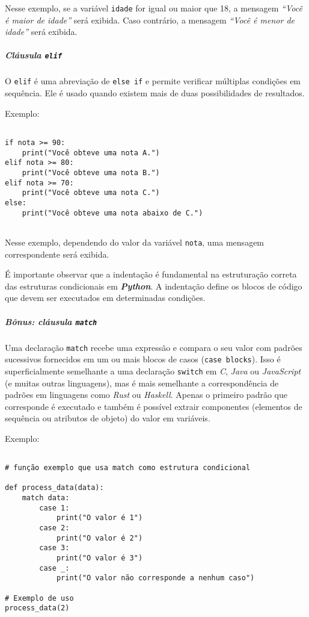 \documentclass[a4paper, 12pt, onecolumn,singlespacing]{article}
\begin{document}
Nesse exemplo, se a variável \texttt{idade} for igual ou maior que 18, a mensagem \textit{``Você é maior de idade''} será exibida. Caso contrário, a mensagem \textit{``Você é menor de idade''} será exibida.

	\subparagraph{Cláusula \texttt{elif}}
	\label{python_clausula_elif}
	O \texttt{elif} é uma abreviação de \texttt{else if} e permite verificar múltiplas condições em sequência. Ele é usado quando existem mais de duas possibilidades de resultados.
	
	
	Exemplo:
	
	
	\begin{verbatim}
		
if nota >= 90:
	print("Você obteve uma nota A.")
elif nota >= 80:
	print("Você obteve uma nota B.")
elif nota >= 70:
	print("Você obteve uma nota C.")
else:
	print("Você obteve uma nota abaixo de C.")
	
	\end{verbatim}
	\label{clausula_elif}
	
	
Nesse exemplo, dependendo do valor da variável \texttt{nota}, uma mensagem correspondente será exibida.

É importante observar que a indentação é fundamental na estruturação correta das estruturas condicionais em \textbf{\textit{Python}}. A indentação define os blocos de código que devem ser executados em determinadas condições.
	
	\subparagraph{Bônus: cláusula \texttt{match}} 
	\label{python_clausula_match}
	Uma declaração \texttt{match} recebe uma expressão e compara o seu valor com padrões sucessivos fornecidos em um ou mais blocos de casos (\texttt{case blocks}). Isso é superficialmente semelhante a uma declaração \texttt{switch} em \textit{C}, \textit{Java} ou \textit{JavaScript} (e muitas outras linguagens), mas é mais semelhante a correspondência de padrões em linguagens como \textit{Rust} ou \textit{Haskell}. Apenas o primeiro padrão que corresponde é executado e também é possível extrair componentes (elementos de sequência ou atributos de objeto) do valor em variáveis.
	
	Exemplo:
	
	
	\begin{verbatim}

# função exemplo que usa match como estrutura condicional

def process_data(data):
	match data:
		case 1:
			print("O valor é 1")
		case 2:
			print("O valor é 2")
		case 3:
			print("O valor é 3")
		case _:
			print("O valor não corresponde a nenhum caso")

# Exemplo de uso
process_data(2)


	\end{verbatim}
	
\end{document}
